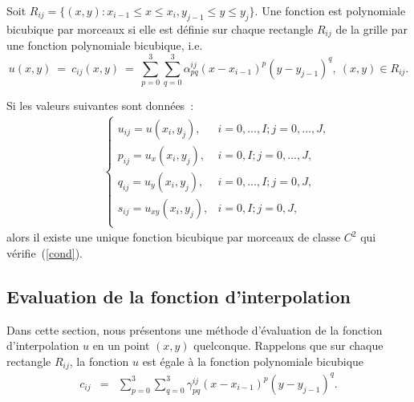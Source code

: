 \begin{defi}
Soit $R_{ij} = \{(x,y):x_{i-1}\leq x \leq x_i, 
y_{j-1} \leq y \leq y_j\}$. Une fonction est polynomiale bicubique 
par morceaux si elle est d\'efinie sur chaque rectangle $R_{ij}$ de 
la grille par une fonction polynomiale bicubique, i.e.
$$
u(x,y) ~=~ c_{ij}(x,y) ~=~ \sum_{p=0}^3 \sum_{q=0}^3 
\alpha_{pq}^{ij}(x-x_{i-1})^p(y-y_{j-1})^q, ~ (x,y) \in R_{ij}.
$$
\end{defi}

\begin{theo}
Si les valeurs suivantes sont donn\'ees~: 
\begin{eqnarray}
&&\begin{cases}
u_{ij} = u(x_i,y_j), & i=0,...,I; j=0,...,J,\\
p_{ij} = u_x(x_i,y_j), & i=0,I; j=0,...,J,\\
q_{ij} = u_y(x_i,y_j), & i=0,...,I; j=0,J,\\
s_{ij} = u_{xy}(x_i,y_j), & i=0,I; j=0,J,\\
\end{cases}
\label{cond}
\end{eqnarray}
alors il existe une unique fonction bicubique par morceaux de classe 
$C^2$ qui v\'erifie~(\ref{cond}).
\end{theo}

\subsection{Evaluation de la fonction d'interpolation}

Dans cette section, nous pr\'esentons une m\'ethode d'\'evaluation 
de la fonction d'interpolation $u$ en un point $(x,y)$ quelconque. 
Rappelons que sur chaque rectangle $R_{ij}$, la fonction $u$ est 
\'egale \`a la fonction polynomiale bicubique 
\begin{eqnarray}
\label{Cij}
c_{ij} &=& \sum_{p=0}^3 \sum_{q=0}^3 
\gamma_{pq}^{ij}(x-x_{i-1})^p(y-y_{j-1})^q.
\end{eqnarray}

